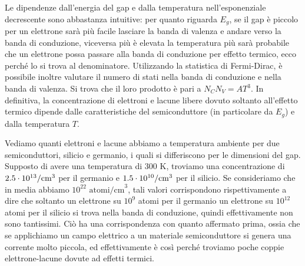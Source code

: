 Le dipendenze dall'energia del gap e dalla temperatura nell'esponenziale decrescente sono abbastanza intuitive: per quanto riguarda $E_g$, se il gap è piccolo per un elettrone sarà più facile lasciare la banda di valenza e andare verso la banda di conduzione, viceversa più è elevata la temperatura più sarà probabile che un elettrone possa passare alla banda di conduzione per effetto termico, ecco perché lo si trova al denominatore. Utilizzando la statistica di Fermi-Dirac, è possibile inoltre valutare il numero di stati nella banda di conduzione e nella banda di valenza. Si trova che il loro prodotto è pari a $N_C N_V=AT^3$. In definitiva, la concentrazione di elettroni e lacune libere dovuto soltanto all'effetto termico dipende dalle caratteristiche del semiconduttore (in particolare da $E_g$) e dalla temperatura $T$.

Vediamo quanti elettroni e lacune abbiamo a temperatura ambiente per due semiconduttori, silicio e germanio, i quali si differiscono per le dimensioni del gap. Supposto di avere una temperatura di 300 K, troviamo una concentrazione di $2.5 \cdot 10^{13}/\rm cm^3$ per il germanio e $1.5 \cdot 10^{10}/\rm cm^3$ per il silicio. Se consideriamo che in media abbiamo $10^{22} \text{ atomi/cm}^3$, tali valori corrispondono rispettivamente a dire che soltanto un elettrone su $10^9$ atomi per il germanio un elettrone su $10^{12}$ atomi per il silicio si trova nella banda di conduzione, quindi effettivamente non sono tantissimi. Ciò ha una corrispondenza con quanto affermato prima, ossia che se applichiamo un campo elettrico a un materiale semiconduttore si genera una corrente molto piccola, ed effettivamente è così perché troviamo poche coppie elettrone-lacune dovute ad effetti termici.
